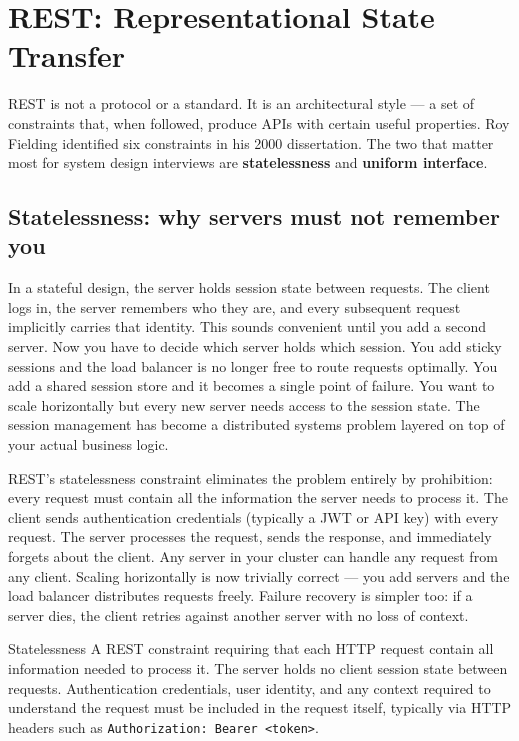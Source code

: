 \documentclass[11pt,a4paper]{article}
\begin{document}
\section{REST: Representational State Transfer}

REST is not a protocol or a standard. It is an architectural style --- a set of constraints that, when followed, produce APIs with certain useful properties. Roy Fielding identified six constraints in his 2000 dissertation. The two that matter most for system design interviews are \textbf{statelessness} and \textbf{uniform interface}.

\subsection{Statelessness: why servers must not remember you}

In a stateful design, the server holds session state between requests. The client logs in, the server remembers who they are, and every subsequent request implicitly carries that identity. This sounds convenient until you add a second server. Now you have to decide which server holds which session. You add sticky sessions and the load balancer is no longer free to route requests optimally. You add a shared session store and it becomes a single point of failure. You want to scale horizontally but every new server needs access to the session state. The session management has become a distributed systems problem layered on top of your actual business logic.

REST's statelessness constraint eliminates the problem entirely by prohibition: every request must contain all the information the server needs to process it. The client sends authentication credentials (typically a JWT or API key) with every request. The server processes the request, sends the response, and immediately forgets about the client. Any server in your cluster can handle any request from any client. Scaling horizontally is now trivially correct --- you add servers and the load balancer distributes requests freely. Failure recovery is simpler too: if a server dies, the client retries against another server with no loss of context.

\begin{termbox}{Statelessness}
A REST constraint requiring that each HTTP request contain all information needed to process it. The server holds no client session state between requests. Authentication credentials, user identity, and any context required to understand the request must be included in the request itself, typically via HTTP headers such as \texttt{Authorization: Bearer <token>}.
\end{termbox}
\end{document}
